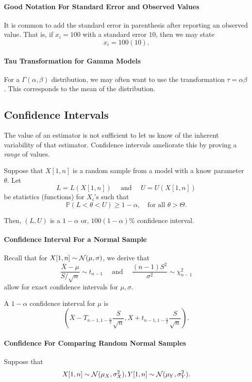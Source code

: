\paragraph{Good Notation For Standard Error and Observed Values}
It is common to add the standard error in parenthesis after reporting an observed value.
That is, if \(x_i = 100\) with a standard error  \(10\), then we may state \[
  x_i = 100(10)
.\] 

\paragraph{Tau Transformation for Gamma Models}
For a \(\Gamma(\alpha, \beta)\) distribution, we may often want
to use the transformation  \(\tau = \alpha \beta\). This corresponds
to the mean of the distribution.


\subsection{Confidence Intervals}
The value of an estimator is not sufficient to let us know of the inherent variability
of that estimator. Confidence intervals ameliorate this by proving a \textit{range}
of values.

Suppose that \(X[1, n]\) is a random sample from a model with a know parameter  \(\theta\).
Let \[
  L = L(X[1, n]) \quad \text{ and } \quad U = U(X[1, n])
\]  be statistics (functions) for \(X_i\)'s such that  \[
  \mathbb{P}(L < \theta < U) \geq 1 - \alpha, \quad \text{for all } \theta > \Theta
.\] 

Then, \((L, U)\) is a  \(1 - \alpha\) or,  \(100(1 - \alpha)\%\) confidence interval.

\paragraph{Confidence Interval For a Normal Sample}
Recall that for \(X[1, n] \sim \mathcal{N}(\mu, \sigma)\), we derive that \[
  \frac{\overline{X} - \mu}{S/\sqrt{n}} \sim t_{n - 1}
  \quad \text{ and } \quad
  \frac{(n - 1)S^2}{\sigma^2} \sim \chi^2_{n - 1}
\]  allow for exact confidence intervals for \(\mu, \sigma\).

A \(1 - \alpha\) confidence interval for  \(\mu\) is  \[
  \left(
    \overline{X} - T_{n - 1, 1 - \frac{\alpha}{2}} \frac{S}{\sqrt{n} },
    X + t_{n - 1, 1 - \frac{\alpha}{2}} \frac{S}{\sqrt{n}}
  \right)
.\]

\paragraph{Confidence For Comparing Random Normal Samples}
Suppose that \[
  X[1, n] \sim \mathcal{N}(\mu_X, \sigma_X^2), 
  Y[1, n] \sim \mathcal{N}(\mu_Y, \sigma_Y^2)
.\] 

